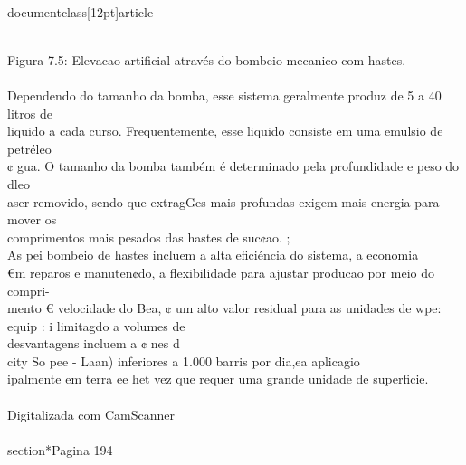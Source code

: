 \\documentclass[12pt]{article}
\begin{document}
\\
Figura 7.5: Elevacao artificial através do bombeio mecanico com hastes.\\
\\
Dependendo do tamanho da bomba, esse sistema geralmente produz de 5 a 40 litros de\\
liquido a cada curso. Frequentemente, esse liquido consiste em uma emulsio de petréleo\\
¢ gua. O tamanho da bomba também é determinado pela profundidade e peso do dleo\\
aser removido, sendo que extragGes mais profundas exigem mais energia para mover os\\
comprimentos mais pesados das hastes de suc¢ao. ;\\
As pei bombeio de hastes incluem a alta eficiéncia do sistema, a economia\\
€m reparos e manuten¢do, a flexibilidade para ajustar producao por meio do compri-\\
mento € velocidade do Bea, ¢ um alto valor residual para as unidades de wpe:\\
equip : i limitagdo a volumes de\\
desvantagens incluem a ¢ nes d\\
city So pee - Laan) inferiores a 1.000 barris por dia,ea aplicagio\\
ipalmente em terra ee het vez que requer uma grande unidade de superficie.\\
\\
Digitalizada com CamScanner\\

\\section*{Pagina 194}
\end{document}
